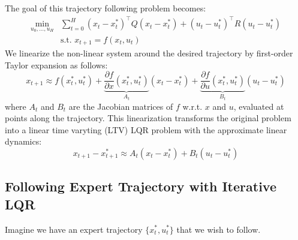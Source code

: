 \documentclass[a4paper]{article}
\begin{document}
The goal of this trajectory following problem becomes:
\begin{align}
\min_{u_0,\ldots,u_H}&\sum_{t=0}^H (x_t-x^*_t)^\intercal Q (x_t-x^*_t) + (u_t-u^*_t)^\intercal R(u_t-u^*_t) \\
&\text{s.t. } x_{t+1} = f(x_t,u_t)
\end{align}
We linearize the non-linear system around the desired trajectory by first-order Taylor expansion as follows:
\begin{equation}
x_{t+1} \approx f(x^*_t,u^*_t) + \underbrace{\frac{\partial f}{\partial x}(x^*_t,u^*_t)}_{A_t}(x_t-x^*_t) + \underbrace{\frac{\partial f}{\partial u}(x^*_t,u^*_t)}_{B_t}(u_t-u^*_t)
\end{equation}
where $A_t$ and $B_t$ are the Jacobian matrices of $f$ w.r.t. $x$ and $u$, evaluated at points along the trajectory. This linearization transforms the original problem into a linear time varyting (LTV) LQR problem with the approximate linear dynamics:
\begin{equation}
x_{t+1} - x^*_{t+1} \approx A_t(x_t - x^*_t) + B_t(u_t - u^*_t)
\end{equation}
\subsection{Following Expert Trajectory with Iterative LQR}
Imagine we have an expert trajectory $\{x^*_t, u^*_t\}$ that we wish to follow. 
\end{document}
